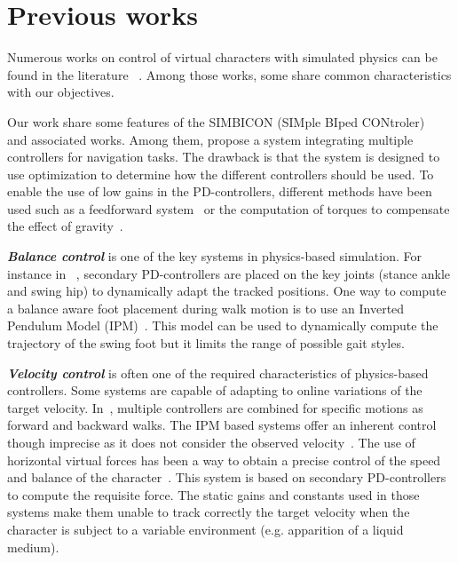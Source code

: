 \documentclass[runningheads,a4paper,10pt]{llncs}
\begin{document}
\section{Previous works}
\label{sec:previous_works}

Numerous works on control of virtual characters with simulated physics can be found in the literature ~\citep{geijtenbeek2012interactive}. Among those works, some share common characteristics with our objectives.

Our work share some features of the SIMBICON (SIMple BIped CONtroler)~\citep{yin2007simbicon} and associated works. Among them, \citep{coros2009robust} propose a system integrating multiple controllers for navigation tasks. The drawback is that the system is designed to use optimization to determine how the different controllers should be used. To enable the use of low gains in the PD-controllers, different methods have been used such as a feedforward system~\citep{yin2007simbicon} or the computation of torques to compensate the effect of gravity~\citep{coros2010generalized}.

\textbf{\textit{Balance control}} is one of the key systems in physics-based simulation. For instance in ~\citep{yin2007simbicon}, secondary PD-controllers are placed on the key joints (stance ankle and swing hip) to dynamically adapt the tracked positions. One way to compute a balance aware foot placement during walk motion is to use an Inverted Pendulum Model (IPM)~\citep{coros2010generalized,kajita20013d}. This model can be used to dynamically compute the trajectory of the swing foot but it limits the range of possible gait styles.

\textbf{\textit{Velocity control}} is often one of the required characteristics of physics-based controllers. Some systems are capable of adapting to online variations of the target velocity. In~\citep{coros2009robust}, multiple controllers are combined for specific motions as forward and backward walks. The IPM based systems offer an inherent control though imprecise as it does not consider the observed velocity~\citep{coros2010generalized}. The use of horizontal virtual forces has been a way to obtain a precise control of the speed and balance of the character~\citep{coros2010generalized,geijtenbeek2012simple}. This system is based on secondary PD-controllers to compute the requisite force. The static gains and constants used in those systems make them unable to track correctly the target velocity when the character is subject to a variable environment (e.g. apparition of a liquid medium). 
\end{document}
